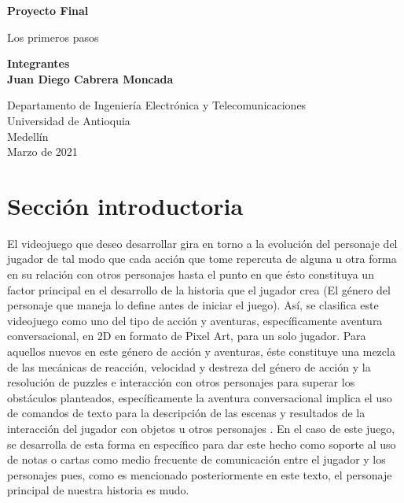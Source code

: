 \documentclass{article}
\begin{document}
\begin{titlepage}
    \begin{center}
        \vspace*{1cm}
            
        \Huge
        \textbf{Proyecto Final}
            
        \vspace{0.5cm}
        \LARGE
        Los primeros pasos
            
        \vspace{1.5cm}
            
        \textbf{Integrantes\\}
        \textbf{Juan Diego Cabrera Moncada}
            
        \vfill
            
        \vspace{0.8cm}
            
        \Large
        Departamento de Ingeniería Electrónica y Telecomunicaciones\\
        Universidad de Antioquia\\
        Medellín\\
        Marzo de 2021
            
    \end{center}
\end{titlepage}

\tableofcontents
\newpage
\section{Sección introductoria}\label{intro}
El videojuego que deseo desarrollar gira en torno a la evolución del personaje del jugador de tal modo que cada acción que tome repercuta de alguna u otra forma en su relación con otros personajes hasta el punto en que ésto constituya un factor principal en el desarrollo de la historia que el jugador crea (El género del personaje que maneja lo define antes de iniciar el juego). Así, se clasifica este videojuego como uno del tipo de acción y aventuras, específicamente aventura conversacional, en 2D en formato de Pixel Art, para un solo jugador.
Para aquellos nuevos en este género de acción y aventuras, éste constituye una mezcla de las mecánicas de reacción, velocidad y destreza del género de acción \cite{GamerDicAct} y la resolución de puzzles e interacción con otros personajes para superar los obstáculos planteados, específicamente la aventura conversacional implica el uso de comandos de texto para la descripción de las escenas y resultados de la interacción del jugador con objetos u otros personajes \cite{GamerDicAdv}. En el caso de este juego, se desarrolla de esta forma en específico para dar este hecho como soporte al uso de notas o cartas como medio frecuente de comunicación entre el jugador y los personajes pues, como es mencionado posteriormente en este texto, el personaje principal de nuestra historia es mudo.
\end{document}
